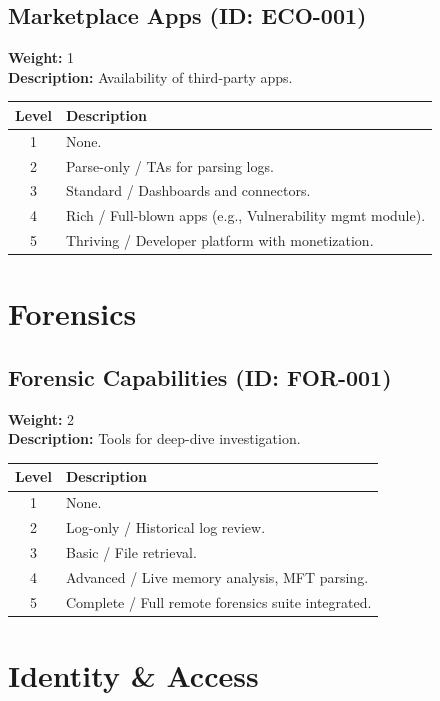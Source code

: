 \documentclass{article}
\begin{document}
\subsection{Marketplace Apps (ID: ECO-001)}
\textbf{Weight:} 1 \\
\textbf{Description:} Availability of third-party apps.
\vspace{0.3cm}
\begin{longtable}{|c|p{12cm}|}
\hline
\rowcolor{lightgray} \textbf{Level} & \textbf{Description} \\ \hline
1 & None. \\ \hline
2 & Parse-only / TAs for parsing logs. \\ \hline
3 & Standard / Dashboards and connectors. \\ \hline
4 & Rich / Full-blown apps (e.g., Vulnerability mgmt module). \\ \hline
5 & Thriving / Developer platform with monetization. \\ \hline
\end{longtable}
\vspace{0.5cm}
\section{Forensics}
\subsection{Forensic Capabilities (ID: FOR-001)}
\textbf{Weight:} 2 \\
\textbf{Description:} Tools for deep-dive investigation.
\vspace{0.3cm}
\begin{longtable}{|c|p{12cm}|}
\hline
\rowcolor{lightgray} \textbf{Level} & \textbf{Description} \\ \hline
1 & None. \\ \hline
2 & Log-only / Historical log review. \\ \hline
3 & Basic / File retrieval. \\ \hline
4 & Advanced / Live memory analysis, MFT parsing. \\ \hline
5 & Complete / Full remote forensics suite integrated. \\ \hline
\end{longtable}
\vspace{0.5cm}
\section{Identity \& Access}
\end{document}
